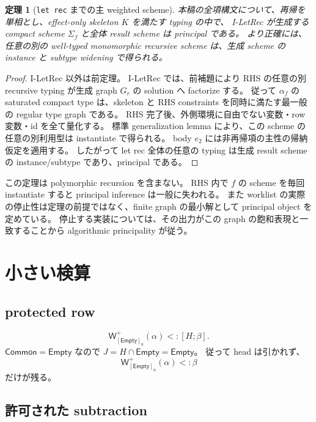 \documentclass[uplatex,dvipdfmx,a4paper,10.5pt]{jsarticle}
\theoremstyle{jpplain}
\newtheorem{theorem}[definition]{定理}
\newcommand{\Empty}{\mathsf{Empty}}
\newcommand{\Common}{\mathsf{Common}}
\newcommand{\PWeight}[2]{\mathsf{W}^{+}_{#1}(#2)}
\newcommand{\takeop}[2]{[#1]_{#2}}
\newcommand{\row}[2]{[#1;#2]}
\begin{document}
\begin{theorem}[\texttt{let rec} までの主 weighted scheme]
本稿の全項構文について、再帰を単相とし、effect-only skeleton $K$ を満たす typing の中で、
I-LetRec が生成する compact scheme $\Sigma_f$ と全体 result scheme は principal である。
より正確には、任意の別の well-typed monomorphic recursive scheme は、生成 scheme の instance と subtype widening で得られる。
\end{theorem}

\begin{proof}
I-LetRec 以外は前定理。
I-LetRec では、前補題により RHS の任意の別 recursive typing が生成 graph $G_r$ の solution へ factorize する。
従って $\alpha_f$ の saturated compact type は、skeleton と RHS constraints を同時に満たす最一般の regular type graph である。
RHS 完了後、外側環境に自由でない変数・row 変数・id を全て量化する。
標準 generalization lemma により、この scheme の任意の別利用型は instantiate で得られる。
body $e_2$ には非再帰項の主性の帰納仮定を適用する。
したがって let rec 全体の任意の typing は生成 result scheme の instance/subtype であり、principal である。
\end{proof}

\begin{notebox}
この定理は polymorphic recursion を含まない。
RHS 内で $f$ の scheme を毎回 instantiate すると principal inference は一般に失われる。
また worklist の実際の停止性は定理の前提ではなく、finite graph の最小解として principal object を定めている。
停止する実装については、その出力がこの graph の飽和表現と一致することから algorithmic principality が従う。
\end{notebox}

\section{小さい検算}

\subsection{protected row}

\[
  \PWeight{\takeop{\Empty}{u}}{\alpha}<:\row{H}{\beta}.
\]
$\Common=\Empty$ なので $J=H\cap\Empty=\Empty$。
従って head は引かれず、
\[
  \PWeight{\takeop{\Empty}{u}}{\alpha}<:\beta
\]
だけが残る。

\subsection{許可された subtraction}
\end{document}
